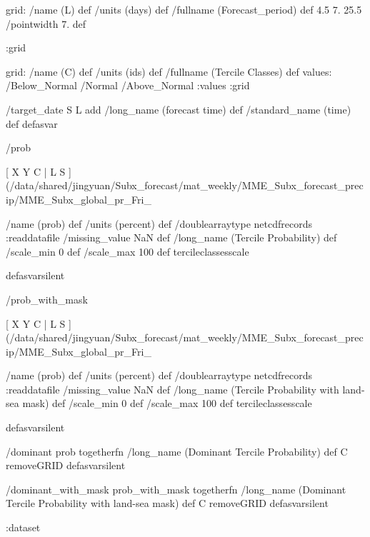 \begin{ingrid}
grid:
/name (L) def
/units (days) def
/fullname (Forecast_period) def
4.5 7. 25.5
/pointwidth 7. def


:grid

grid:
/name (C) def
/units (ids) def
/fullname (Tercile Classes) def
values: /Below_Normal /Normal /Above_Normal :values
:grid

/target_date { S L add /long_name (forecast time) def /standard_name (time) def } defasvar

/prob {
[ X Y C | L S ] (/data/shared/jingyuan/Subx_forecast/mat_weekly/MME_Subx_forecast_precip/MME_Subx_global_pr_Fri_%

/name (prob) def
/units (percent) def
/doublearraytype netcdfrecords :readdatafile
/missing_value NaN def
/long_name (Tercile Probability) def
/scale_min 0 def
/scale_max 100 def
tercileclassesscale
} defasvarsilent

/prob_with_mask {
[ X Y C | L S ] (/data/shared/jingyuan/Subx_forecast/mat_weekly/MME_Subx_forecast_precip/MME_Subx_global_pr_Fri_%

/name (prob) def
/units (percent) def
/doublearraytype netcdfrecords :readdatafile
/missing_value NaN def
/long_name (Tercile Probability with land-sea mask) def
/scale_min 0 def
/scale_max 100 def
tercileclassesscale
} defasvarsilent


/dominant {
prob togetherfn
/long_name (Dominant Tercile Probability) def
C removeGRID
} defasvarsilent


/dominant_with_mask {
prob_with_mask togetherfn
/long_name (Dominant Tercile Probability with land-sea mask) def
C removeGRID
} defasvarsilent



:dataset
\end{ingrid}
